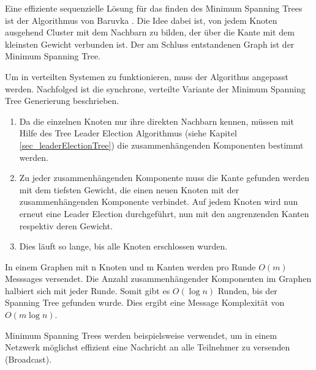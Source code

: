 Eine effiziente sequenzielle Lösung für das finden des Minimum Spanning Trees ist der Algorithmus von Baruvka \cite{wiki:boruvka}. Die Idee dabei ist, von jedem Knoten ausgehend Cluster mit dem Nachbarn zu bilden, der über die Kante mit dem kleinsten Gewicht verbunden ist. Der am Schluss entstandenen Graph ist der Minimum Spanning Tree.

Um in verteilten Systemen zu funktionieren, muss der Algorithus angepasst werden. Nachfolged ist die synchrone, verteilte Variante der Minimum Spanning Tree Generierung beschrieben.


\begin{enumerate}
	\item Da die einzelnen Knoten nur ihre direkten Nachbarn kennen, müssen mit Hilfe des Tree Leader Election Algorithmus (siehe Kapitel \ref{sec_leaderElectionTree}) die zusammenhängenden Komponenten bestimmt werden.
    \item Zu jeder zusammenhängenden Komponente muss die Kante gefunden werden mit dem tiefsten Gewicht, die einen neuen Knoten mit der zusammenhängenden Komponente verbindet. Auf jedem Knoten wird nun erneut eine Leader Election durchgeführt, nun mit den angrenzenden Kanten respektiv deren Gewicht.
    \item Dies läuft so lange, bis alle Knoten erschlossen wurden.
\end{enumerate}

In einem Graphen mit n Knoten und m Kanten werden pro Runde $O(m)$ Messsages versendet. Die Anzahl zusammenhängender Komponenten im Graphen halbiert sich mit jeder Runde. Somit gibt es $O(\log{}n)$ Runden, bis der Spanning Tree gefunden wurde. Dies ergibt eine Message Komplexität von $O(m\log{}n)$.

Minimum Spanning Trees werden beispielsweise verwendet, um in einem Netzwerk möglichst effizient eine Nachricht an alle Teilnehmer zu versenden (Broadcast).
